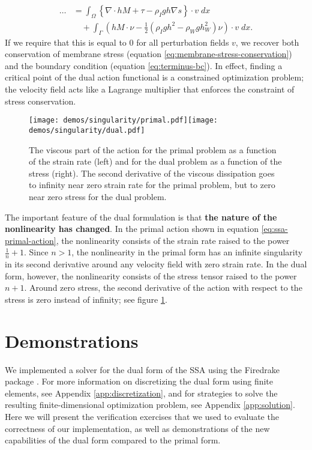 \documentclass[twocolumn,letterpaper]{igs}
\begin{document}
\begin{align}
    \ldots & = \int_\Omega\left\{\nabla\cdot hM + \tau - \rho_Igh\nabla s\right\}\cdot v\;dx \nonumber\\
    & \quad + \int_\Gamma\left(hM\cdot\nu - \frac{1}{2}\left(\rho_Igh^2 - \rho_Wgh_W^2\right)\nu\right)\cdot v\;dx.
\end{align}
If we require that this is equal to 0 for all perturbation fields $v$, we recover both conservation of membrane stress (equation \eqref{eq:membrane-stress-conservation}) and the boundary condition (equation \eqref{eq:terminus-bc}).
In effect, finding a critical point of the dual action functional is a constrained optimization problem; the velocity field acts like a Lagrange multiplier that enforces the constraint of stress conservation.

\begin{figure}[h]
    \texttt{[image: demos/singularity/primal.pdf]}\texttt{[image: demos/singularity/dual.pdf]}
    \caption{The viscous part of the action for the primal problem as a function of the strain rate (left) and for the dual problem as a function of the stress (right).
    The second derivative of the viscous dissipation goes to infinity near zero strain rate for the primal problem, but to zero near zero stress for the dual problem.}
    \label{fig:primal-vs-dual}
\end{figure}

The important feature of the dual formulation is that \textbf{the nature of the nonlinearity has changed}.
In the primal action shown in equation \eqref{eq:ssa-primal-action}, the nonlinearity consists of the strain rate raised to the power $\frac{1}{n} + 1$.
Since $n > 1$, the nonlinearity in the primal form has an infinite singularity in its second derivative around any velocity field with zero strain rate.
In the dual form, however, the nonlinearity consists of the stress tensor raised to the power $n + 1$.
Around zero stress, the second derivative of the action with respect to the stress is zero instead of infinity; see figure \ref{fig:primal-vs-dual}.



\section{Demonstrations}

We implemented a solver for the dual form of the SSA using the Firedrake package \citep{FiredrakeUserManual}.
For more information on discretizing the dual form using finite elements, see Appendix \ref{app:discretization}, and for strategies to solve the resulting finite-dimensional optimization problem, see Appendix \ref{app:solution}.
Here we will present the verification exercises that we used to evaluate the correctness of our implementation, as well as demonstrations of the new capabilities of the dual form compared to the primal form.
\end{document}
